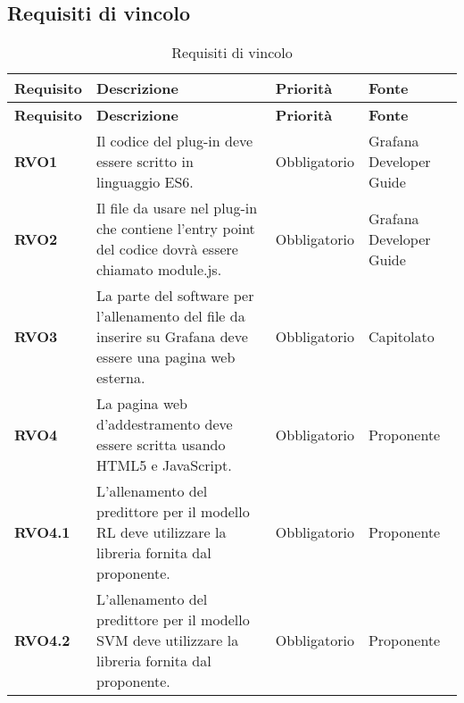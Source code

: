 \subsection{Requisiti di vincolo}
\label{sub:requisiti_di_vincolo}

\renewcommand{\arraystretch}{2} %
\begin{longtable}[H]{>{\centering\bfseries}m{2cm} >{\centering}m{9cm} >{\centering}m{2.5cm} >{\centering\arraybackslash}m{2.5cm}}
  \caption{Requisiti di vincolo}%
  \label{tab:requisiti_di_vincolo}                                                    \\
  \rowcolor{lightgray}
  {\textbf{Requisito}} & {\textbf{Descrizione}} & {\textbf{Priorità}} & {\textbf{Fonte}}  \\
  \endfirsthead%
  \rowcolor{lightgray}
  {\textbf{Requisito}} & {\textbf{Descrizione}} & {\textbf{Priorità}} & {\textbf{Fonte}}  \\
  \endhead%
  \rowcolor{white}
  \multicolumn{4}{c}{\textit{Continua alla pagina successiva}}
  \endfoot%
  \endlastfoot%
  \textbf{RVO1} & Il codice del plug-in deve essere scritto in linguaggio ES6. & Obbligatorio & Grafana Developer Guide \\
  \textbf{RVO2} & Il file da usare nel plug-in che contiene l'entry point del codice dovrà essere chiamato module.js. & Obbligatorio & Grafana Developer Guide \\
  \textbf{RVO3} & La parte del software per l'allenamento del file da inserire su Grafana deve essere una pagina web esterna. & Obbligatorio & Capitolato \\
  \textbf{RVO4} & La pagina web d'addestramento deve essere scritta usando HTML5 e JavaScript. & Obbligatorio & Proponente \\
  \textbf{RVO4.1} & L'allenamento del predittore per il modello RL deve utilizzare la libreria fornita dal proponente. & Obbligatorio & Proponente \\
  \textbf{RVO4.2} & L'allenamento del predittore per il modello SVM deve utilizzare la libreria fornita dal proponente. & Obbligatorio & Proponente \\
\end{longtable}

